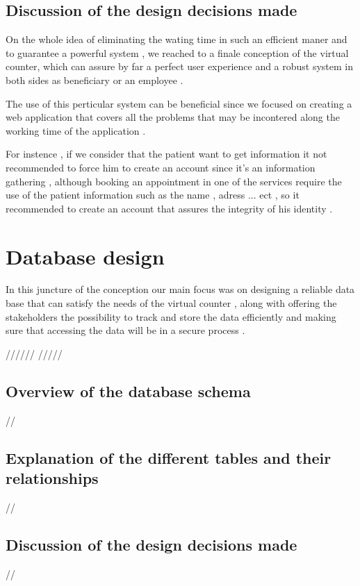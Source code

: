 \subsection{Discussion of the design decisions made}
On the whole idea of  eliminating the wating time in such an efficient maner and to guarantee a powerful system , we reached to a finale conception of the virtual counter, which can assure by far a perfect user experience and a robust system in both sides as beneficiary or an employee . 

\medskip The use of this perticular system can be beneficial since we focused on creating a web application that covers all the problems that may be incontered along the working time of the application . 
 
For instence , if we consider that the patient want to get information it not recommended to force him to create an account since it's an information gathering , although booking an appointment in one of the services require the use of the patient information such as the name , adress ... ect , so it recommended to create an account that assures the integrity of his identity .    
\section{Database design}
In this juncture of the conception our main focus was on designing a reliable data base that can satisfy the needs of the virtual counter , along with offering the stakeholders the possibility to track and store the data efficiently and making sure that accessing the data will be in a secure process . 

//////
/////
\subsection{Overview of the database schema}
//
\subsection{Explanation of the different tables and their relationships}
//
\subsection{Discussion of the design decisions made}

//